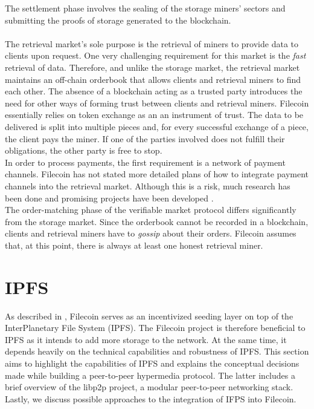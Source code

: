\documentclass[conference]{IEEEtran}
\begin{document}
The settlement phase involves the sealing of the storage miners' sectors and submitting the proofs of storage generated to the blockchain.\cite{filecoin}
\\
\\
The retrieval market's sole purpose is the retrieval of miners to provide data to clients upon request.
One very challenging requirement for this market is the \textit{fast} retrieval of data.
Therefore, and unlike the storage market, the retrieval market maintains an off-chain orderbook that allows clients and retrieval miners to find each other.
The absence of a blockchain acting as a trusted party introduces the need for other ways of forming trust between clients and retrieval miners.
Filecoin essentially relies on token exchange as an an instrument of trust.
The data to be delivered is split into multiple pieces and, for every successful exchange of a piece, the client pays the miner.
If one of the parties involved does not fulfill their obligations, the other party is free to stop.
\\
\indent In order to process payments, the first requirement is a network of payment channels.
Filecoin has not stated more detailed plans of how to integrate payment channels into the retrieval market. 
Although this is a risk, much research has been done and promising projects have been developed \cite{lightning}.
\\
\indent The order-matching phase of the verifiable market protocol differs significantly from the storage market.
Since the orderbook cannot be recorded in a blockchain, clients and retrieval miners have to \textit{gossip} about their orders.
Filecoin assumes that, at this point, there is always at least one honest retrieval miner.
\cite{filecoin}

\section{IPFS}
\label{sec:ipfs}
As described in \cite{filecoin}, Filecoin serves as an incentivized seeding layer on top of the InterPlanetary File System (IPFS)\cite{ipfs-whitepaper}.
The Filecoin project is therefore beneficial to IPFS as it intends to add more storage to the network. 
At the same time, it depends heavily on the technical capabilities and robustness of IPFS.
This section aims to highlight the capabilities of IPFS and explains the conceptual decisions made while building a peer-to-peer hypermedia protocol.
The latter includes a brief overview of the libp2p project\cite{libp2p}, a modular peer-to-peer networking stack.
Lastly, we discuss possible approaches to the integration of IFPS into Filecoin.
\end{document}
